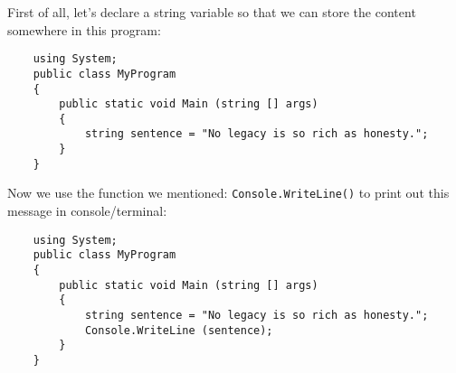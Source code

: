 \documentclass[../main.tex]{subfiles}
\begin{document}
First of all, let's declare a string variable so that we can store the content
somewhere in this program:

\begin{verbatim}
    using System;
    public class MyProgram
    {
        public static void Main (string [] args)
        {
            string sentence = "No legacy is so rich as honesty.";
        }
    }
\end{verbatim}

Now we use the function we mentioned: \texttt{Console.WriteLine()} to print out
this message in console/terminal:

\begin{verbatim}
    using System;
    public class MyProgram
    {
        public static void Main (string [] args)
        {
            string sentence = "No legacy is so rich as honesty.";
            Console.WriteLine (sentence);
        }
    }
\end{verbatim}
\end{document}
